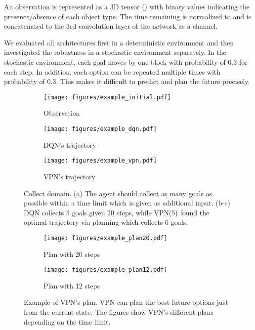\documentclass{article}
\begin{document}
An observation is represented as a 3D tensor () with binary values indicating the presence/absence of each object type. The time remaining is normalized to  and is concatenated to the 3rd convolution layer of the network as a channel. 

We evaluated all architectures first in a deterministic environment and then investigated the robustness in a stochastic environment separately. In the stochastic environment, each goal moves by one block with probability of 0.3 for each step. In addition, each option can be repeated multiple times with probability of 0.3. This makes it difficult to predict and plan the future precisely.


\begin{figure}[t]
\centering
\begin{minipage}{.57\textwidth}
    \begin{subfigure}{0.32\linewidth}
    	\centering
	    \texttt{[image: figures/example\_initial.pdf]}  
	    \caption{Observation}
   	\end{subfigure}
   	\begin{subfigure}{0.32\linewidth}
    		\centering
	    \texttt{[image: figures/example\_dqn.pdf]} 
	    \caption{DQN's trajectory}
   	\end{subfigure}
	\begin{subfigure}{0.32\linewidth}
    		\centering
	    \texttt{[image: figures/example\_vpn.pdf]}  
	    \caption{VPN's trajectory}
   	\end{subfigure}
   	\vspace{-5pt}
   	\caption{Collect domain. (a) The agent should collect as many goals as possible within a time limit which is given as additional input. (b-c) DQN collects 5 goals given 20 steps, while VPN(5) found the optimal trajectory via planning which collects 6 goals. }
    \label{fig:collect}
\end{minipage}\hfill
\begin{minipage}{.39\textwidth}
  \centering
  \begin{subfigure}{0.49\linewidth}
    		\centering
	    \texttt{[image: figures/example\_plan20.pdf]}  
	    \caption{Plan with 20 steps}
   	\end{subfigure}
   	\begin{subfigure}{0.49\linewidth}
    	\centering
	    \texttt{[image: figures/example\_plan12.pdf]}
	    \caption{Plan with 12 steps}
   	\end{subfigure}
   	\vspace{-5pt}
  \caption{Example of VPN's plan. VPN can plan the best future options just from the current state. The figures show VPN's different plans depending on the time limit.}
  \label{fig:example}
\end{minipage}
\vspace{-13pt}
\end{figure}
\end{document}
